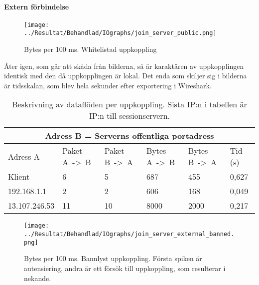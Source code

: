 \documentclass[journal,comsoc]{IEEEtran}
\begin{document}
\paragraph{Extern förbindelse}
\begin{figure} [H]
  \centering
  \texttt{[image: ../Resultat/Behandlad/IOgraphs/join\_server\_public.png]}
  \caption{Bytes per 100 ms. Whitelistad uppkoppling}
  \label{fig:server:externconn:whitelist}
\end{figure}
Åter igen, som går att skåda från bilderna, så är karaktären av uppkopplingen identisk med den då uppkopplingen är lokal. Det enda som skiljer sig i bilderna är tidsskalan, som blev hela sekunder efter exportering i Wireshark.
\begin{table} [H]
  \begin{center}
    \label{table:server:externconn:whitelist}
    \begin{tabular}{ | m{1.5cm} |  m{1cm} | m{1cm}| m{1cm}|m{1cm}|m{0.5cm}| } 
      \hline
      \multicolumn{6}{|c|}{Adress B = Serverns offentliga portadress} \\
      \hline
      Adress A & Paket A~->~B & Paket B~->~A & Bytes A~->~B & Bytes B~->~A & Tid (s) \\
      \hline
      Klient & 6 & 5 & 687 & 455 & 0,627 \\
      \hline
      192.168.1.1 & 2 & 2 & 606 & 168 & 0,049 \\
      \hline   
      13.107.246.53 & 11 & 10 & 8000 & 2000 & 0,217 \\
      \hline 
    \end{tabular}
  \end{center}
  \caption{Beskrivning av dataflöden per uppkoppling. Sista IP:n i tabellen är IP:n till sessionservern.}
\end{table}
\begin{figure} [H]
  \centering
  \texttt{[image: ../Resultat/Behandlad/IOgraphs/join\_server\_external\_banned.png]}
  \caption{Bytes per 100 ms. Bannlyst uppkoppling. Första spiken är autensiering, andra är ett försök till uppkoppling, som resulterar i nekande.}
  \label{fig:server:externconn:banned}
\end{figure}
\end{document}
